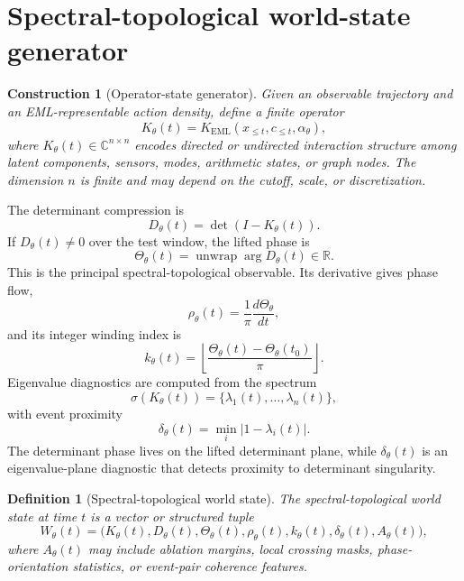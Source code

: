 \documentclass[11pt]{article}
\newtheorem{definition}{Definition}
\newtheorem{construction}{Construction}
\begin{document}
\section{Spectral-topological world-state generator}
\begin{construction}[Operator-state generator]
Given an observable trajectory and an EML-representable action density, define a finite operator
\begin{equation}
K_\theta(t)=K_{\mathrm{EML}}(x_{\le t},c_{\le t},\alpha_\theta),
\end{equation}
where $K_\theta(t)\in \mathbb{C}^{n\times n}$ encodes directed or undirected interaction structure among latent components, sensors, modes, arithmetic states, or graph nodes. The dimension $n$ is finite and may depend on the cutoff, scale, or discretization.
\end{construction}

The determinant compression is
\begin{equation}
D_\theta(t)=\det(I-K_\theta(t)).
\end{equation}
If $D_\theta(t)\ne 0$ over the test window, the lifted phase is
\begin{equation}
\Theta_\theta(t)=\operatorname{unwrap}\arg D_\theta(t)\in \mathbb{R}.
\end{equation}
This is the principal spectral-topological observable. Its derivative gives phase flow,
\begin{equation}
\rho_\theta(t)=\frac{1}{\pi}\frac{d\Theta_\theta}{dt},
\end{equation}
and its integer winding index is
\begin{equation}
k_\theta(t)=\left\lfloor \frac{\Theta_\theta(t)-\Theta_\theta(t_0)}{\pi}\right\rfloor .
\end{equation}
Eigenvalue diagnostics are computed from the spectrum
\begin{equation}
\sigma(K_\theta(t))=\{\lambda_1(t),\ldots,\lambda_n(t)\},
\end{equation}
with event proximity
\begin{equation}
\delta_\theta(t)=\min_i |1-\lambda_i(t)|.
\end{equation}
The determinant phase lives on the lifted determinant plane, while $\delta_\theta(t)$ is an eigenvalue-plane diagnostic that detects proximity to determinant singularity.

\begin{definition}[Spectral-topological world state]
The spectral-topological world state at time $t$ is a vector or structured tuple
\begin{equation}
W_\theta(t)=\bigl(K_\theta(t),D_\theta(t),\Theta_\theta(t),\rho_\theta(t),k_\theta(t),\delta_\theta(t),A_\theta(t)\bigr),
\end{equation}
where $A_\theta(t)$ may include ablation margins, local crossing masks, phase-orientation statistics, or event-pair coherence features.
\end{definition}
\end{document}
